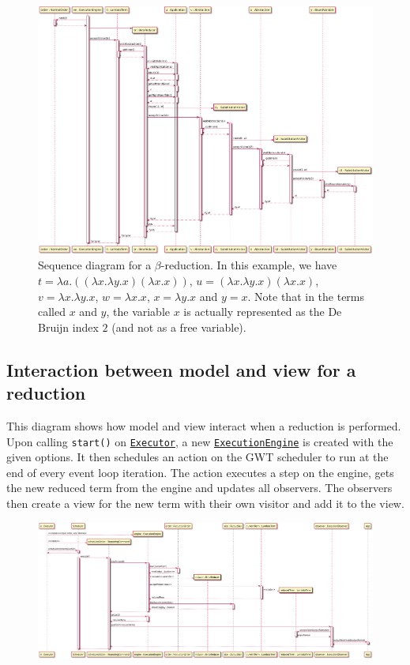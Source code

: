 \begin{figure}[H]
	\centering
	\includegraphics[width=\textwidth]{sequenceDiagrams/betaReduction}
	\caption{Sequence diagram for a $\beta$-reduction. In this example, we have $t = \lambda a.((\lambda x.\lambda y.x)(\lambda x.x))$,
		$u = (\lambda x.\lambda y.x)(\lambda x.x)$, $v = \lambda x.\lambda y.x$,
		$w = \lambda x.x$, $x = \lambda y.x$ and $y = x$. Note that in the terms called
		$x$ and $y$, the variable $x$ is actually represented as the De Bruijn index $2$
		(and not as a free variable).}
\end{figure}

\subsection{Interaction between model and view for a reduction}
This diagram shows how model and view interact when a reduction is performed. 
Upon calling \texttt{start()} on \texttt{\hyperref[type:edu.kit.wavelength.client.view.execution.Executor]{Executor}}, 
a new \texttt{\hyperref[type:edu.kit.wavelength.client.model.ExecutionEngine]{ExecutionEngine}} is created with the given options.
It then schedules an action on the GWT scheduler to run at the end of every event loop iteration.
The action executes a step on the engine, gets the new reduced term from the engine and updates all observers.
The observers then create a view for the new term with their own visitor and add it to the view.

\begin{figure}[H]
	\centering
	\includegraphics[width=\textwidth]{sequenceDiagrams/interaction}
\end{figure}